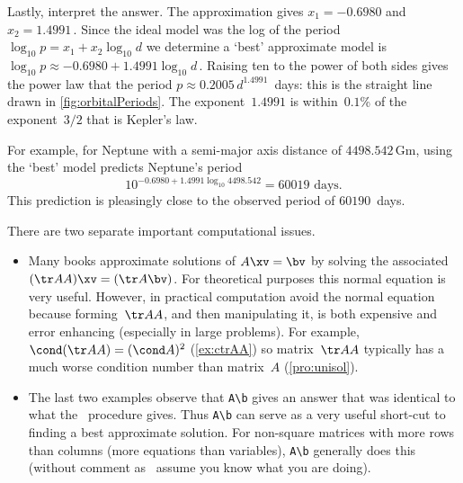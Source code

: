 \begin{example}
\begin{solution}
Lastly, interpret the answer.
The approximation gives \(x_1=-0.6980\) and \(x_2=1.4991\)\,.  
Since the ideal model was the log of the period \(\log_{10}p=x_1+x_2\log_{10}d\) we determine a `best' approximate model is \(\log_{10}p\approx-0.6980+1.4991\log_{10}d\)\,. 
Raising ten to the power of both sides gives the power law that the period \(p\approx0.2005\,d^{1.4991}\)~days: this is the straight line drawn in \autoref{fig:orbitalPeriods}.
The exponent~\(1.4991\) is within~\(0.1\)\% of the exponent~\(3/2\) that is Kepler's law.

For example, for Neptune with a semi-major axis distance of \(4498.542\)\,Gm, using the `best' model predicts Neptune's period\[10^{-0.6980+1.4991\log_{10}4498.542}=60019\text{ days.}\]
This prediction is pleasingly close to the observed period of \(60190\)~days.
\end{solution}
\end{example}





\begin{compute}
There are two separate important computational issues.
\begin{itemize}
\item Many books approximate solutions of \(A\xv=\bv\) by solving the associated  \((\tr AA)\xv=(\tr A\bv)\).  
For theoretical purposes this normal equation is very useful.  
However, in practical computation avoid the normal equation because forming~\(\tr AA\), and then manipulating it, is both expensive and error enhancing (especially in large problems).
For example, \(\cond(\tr AA)=(\cond A)^2\) (\autoref{ex:ctrAA}) so matrix~\(\tr AA\) typically has a much worse condition number than matrix~\(A\) (\autoref{pro:unisol}).

\item The last two examples observe that \verb|A\b| gives an answer that was identical to what the \svd\ procedure gives.
Thus \verb|A\b| can serve as a very useful short-cut to finding a best approximate solution.
For non-square matrices with more rows than columns (more equations than variables), \verb|A\b| generally does this (without comment as \script\ assume you know what you are doing).
\end{itemize}
\end{compute}



\begin{comment}
\nakos{\S8.9} has some useful applications to USA NRL rating of quarterbacks---using data from \emph{The Sports Illustrated 19xx Sports Almanac}.
\end{comment}




